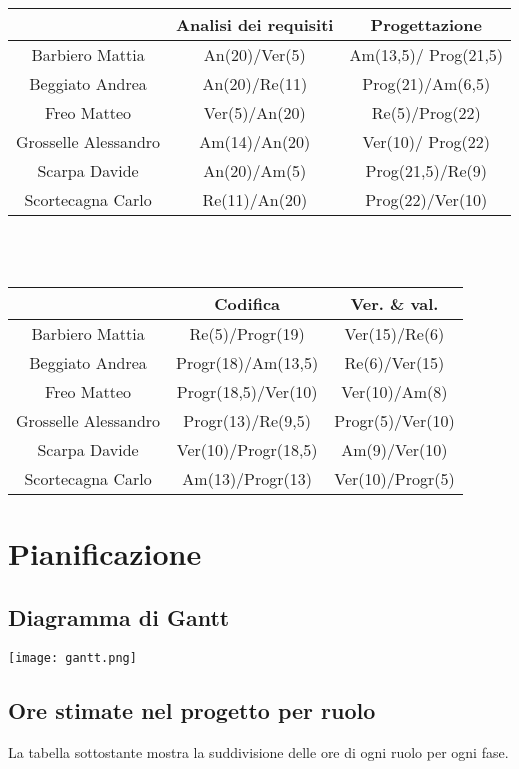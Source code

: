 \documentclass[11pt,a4paper]{article}
\begin{document}
\begin{tabular}{|c|c|c|}
\hline
 & Analisi dei requisiti & Progettazione \\ \hline
Barbiero Mattia & An(20)/Ver(5) & Am(13,5)/ Prog(21,5) \\ \hline
Beggiato Andrea & An(20)/Re(11) & Prog(21)/Am(6,5) \\ \hline
Freo Matteo & Ver(5)/An(20) & Re(5)/Prog(22) \\ \hline
Grosselle Alessandro & Am(14)/An(20) & Ver(10)/ Prog(22) \\ \hline
Scarpa Davide & An(20)/Am(5) & Prog(21,5)/Re(9) \\ \hline
Scortecagna Carlo & Re(11)/An(20) & Prog(22)/Ver(10) \\ \hline
\end{tabular}\\\\

\begin{tabular}{|c|c|c|}
\hline
 & Codifica & Ver. \& val. \\ \hline
Barbiero Mattia & Re(5)/Progr(19) & Ver(15)/Re(6) \\ \hline
Beggiato Andrea & Progr(18)/Am(13,5) & Re(6)/Ver(15) \\ \hline
Freo Matteo & Progr(18,5)/Ver(10) & Ver(10)/Am(8) \\ \hline
Grosselle Alessandro & Progr(13)/Re(9,5) & Progr(5)/Ver(10) \\ \hline
Scarpa Davide & Ver(10)/Progr(18,5) & Am(9)/Ver(10) \\ \hline
Scortecagna Carlo & Am(13)/Progr(13) & Ver(10)/Progr(5) \\ \hline
\end{tabular}


\section{Pianificazione}
\subsection{Diagramma di Gantt}

\texttt{[image: gantt.png]} \\

\subsection{Ore stimate nel progetto per ruolo}
La tabella sottostante mostra la suddivisione delle ore di ogni ruolo per ogni fase.\\
\end{document}

